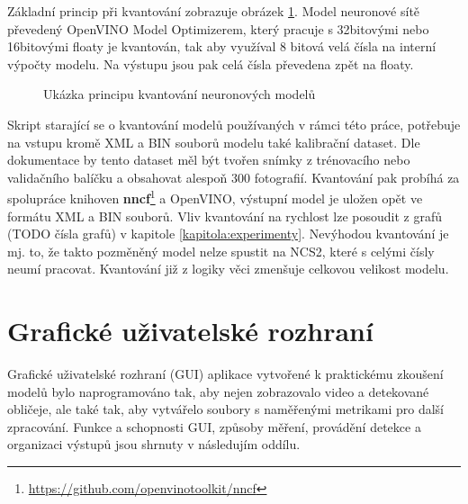 Základní princip při kvantování zobrazuje obrázek \ref{obrazek:kvantovani}. Model neuronové sítě převedený OpenVINO Model Optimizerem, který pracuje s 32bitovými nebo 16bitovými floaty je kvantován, tak aby využíval 8 bitová velá čísla na interní výpočty modelu. Na výstupu jsou pak celá čísla převedena zpět na floaty. 

\begin{figure}[H]
  \begin{center}
  \label{obrazek:kvantovani}
  \caption{Ukázka principu kvantování neuronových modelů \cite{quantization}}
  \end{center}
\end{figure}

Skript starající se o kvantování modelů používaných v rámci této práce, potřebuje na vstupu kromě XML a BIN souborů modelu také kalibrační dataset. Dle dokumentace by tento dataset měl být tvořen snímky z trénovacího nebo validačního balíčku a obsahovat alespoň 300 fotografií. Kvantování pak probíhá za spolupráce knihoven \textbf{nncf}\footnote{\url{https://github.com/openvinotoolkit/nncf}} a OpenVINO, výstupní model je uložen opět ve formátu XML a BIN souborů. Vliv kvantování na rychlost lze posoudit z grafů (TODO čísla grafů) v kapitole \ref{kapitola:experimenty}. Nevýhodou kvantování je mj. to, že takto pozměněný model nelze spustit na NCS2, které s celými čísly neumí pracovat. Kvantování již z logiky věci zmenšuje celkovou velikost modelu.

\section{Grafické uživatelské rozhraní}
\label{sekce:gui}
Grafické uživatelské rozhraní (GUI) aplikace vytvořené k praktickému zkoušení modelů bylo naprogramováno tak, aby nejen zobrazovalo video a detekované obličeje, ale také tak, aby vytvářelo soubory s naměřenými metrikami pro další zpracování. Funkce a schopnosti GUI, způsoby měření, provádění detekce a organizaci výstupů jsou shrnuty v následujím oddílu. 

